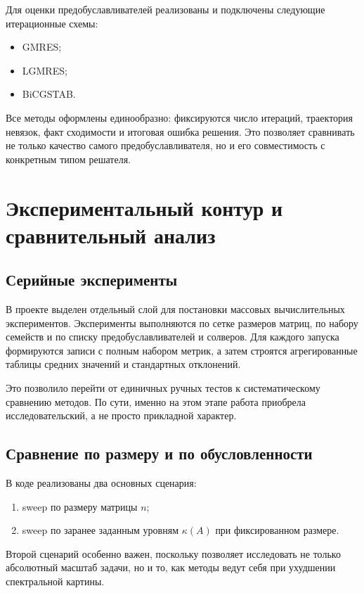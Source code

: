 \documentclass[12pt,a4paper]{article}
\begin{document}
Для оценки предобуславливателей реализованы и подключены следующие итерационные схемы:
\begin{itemize}[leftmargin=*]
    \item GMRES;
    \item LGMRES;
    \item BiCGSTAB.
\end{itemize}

Все методы оформлены единообразно: фиксируются число итераций, траектория невязок, факт сходимости и итоговая ошибка решения. Это позволяет сравнивать не только качество самого предобуславливателя, но и его совместимость с конкретным типом решателя.

\section{Экспериментальный контур и сравнительный анализ}

\subsection{Серийные эксперименты}

В проекте выделен отдельный слой для постановки массовых вычислительных экспериментов. Эксперименты выполняются по сетке размеров матриц, по набору семейств и по списку предобуславливателей и солверов. Для каждого запуска формируются записи с полным набором метрик, а затем строятся агрегированные таблицы средних значений и стандартных отклонений.

Это позволило перейти от единичных ручных тестов к систематическому сравнению методов. По сути, именно на этом этапе работа приобрела исследовательский, а не просто прикладной характер.

\subsection{Сравнение по размеру и по обусловленности}

В коде реализованы два основных сценария:
\begin{enumerate}[label=\arabic*.]
    \item sweep по размеру матрицы $n$;
    \item sweep по заранее заданным уровням $\kappa(A)$ при фиксированном размере.
\end{enumerate}

Второй сценарий особенно важен, поскольку позволяет исследовать не только абсолютный масштаб задачи, но и то, как методы ведут себя при ухудшении спектральной картины.
\end{document}
